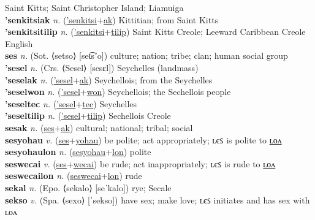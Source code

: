 Saint Kitts; Saint Christopher Island; Liamuiga \label{'senkitsi} \\
\textbf{'senkitsiak} \textit{n.} (\hyperref['senkitsi]{'senkitsi}+\hyperref[ak]{ak})
Kittitian; from Saint Kitts \label{'senkitsiak} \\
\textbf{'senkitsitilip} \textit{n.} (\hyperref['senkitsi]{'senkitsi}+\hyperref[tilip]{tilip})
Saint Kitts Creole; Leeward Caribbean Creole English \label{'senkitsitilip} \\
\textbf{ses} \textit{n.} (Sot. ⟨setso⟩ [set͡sʼo])
culture; nation; tribe; clan; human social group \label{ses} \\
\textbf{'sesel} \textit{n.} (Crs. ⟨Sesel⟩ [sesɛl])
Seychelles (landmass) \label{'sesel} \\
\textbf{'seselak} \textit{n.} (\hyperref['sesel]{'sesel}+\hyperref[ak]{ak})
Seychellois; from the Seychelles \label{'seselak} \\
\textbf{'seselwon} \textit{n.} (\hyperref['sesel]{'sesel}+\hyperref[won]{won})
Seychellois; the Sechellois people \label{'seselwon} \\
\textbf{'seseltec} \textit{n.} (\hyperref['sesel]{'sesel}+\hyperref[tec]{tec})
Seychelles \label{'seseltec} \\
\textbf{'seseltilip} \textit{n.} (\hyperref['sesel]{'sesel}+\hyperref[tilip]{tilip})
Sechellois Creole \label{'seseltilip} \\
\textbf{sesak} \textit{n.} (\hyperref[ses]{ses}+\hyperref[ak]{ak})
cultural; national; tribal; social \label{sesak} \\
\textbf{sesyohau} \textit{v.} (\hyperref[ses]{ses}+\hyperref[yohau]{yohau})
be polite; act appropriately; ʟєꜱ is polite to \hyperref[sesyohaulon]{ʟᴏᴧ} \label{sesyohau} \\
\textbf{sesyohaulon} \textit{n.} (\hyperref[sesyohau]{sesyohau}+\hyperref[lon]{lon})
polite \label{sesyohaulon} \\
\textbf{seswecai} \textit{v.} (\hyperref[ses]{ses}+\hyperref[wecai]{wecai})
be rude; act inappropriately; ʟєꜱ is rude to \hyperref[seswecailon]{ʟᴏᴧ} \label{seswecai} \\
\textbf{seswecailon} \textit{n.} (\hyperref[seswecai]{seswecai}+\hyperref[lon]{lon})
rude \label{seswecailon} \\
\textbf{sekal} \textit{n.} (Epo. ⟨sekalo⟩ [seˈkalo])
rye; Secale \label{sekal} \\
\textbf{sekso} \textit{v.} (Spa. ⟨sexo⟩ [ˈsekso])
have sex; make love; ʟєꜱ initiates and has sex with ʟᴏᴧ \label{sekso} \\
